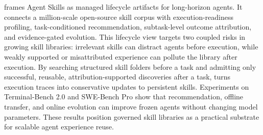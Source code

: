 \ours frames Agent Skills as managed lifecycle artifacts for long-horizon agents. It connects a million-scale open-source skill corpus with execution-readiness profiling, task-conditioned recommendation, subtask-level outcome attribution, and evidence-gated evolution. This lifecycle view targets two coupled risks in growing skill libraries: irrelevant skills can distract agents before execution, while weakly supported or misattributed experience can pollute the library after execution. By searching structured skill folders before a task and admitting only successful, reusable, attribution-supported discoveries after a task, \ours turns execution traces into conservative updates to persistent skills. Experiments on Terminal-Bench 2.0 and SWE-Bench Pro show that recommendation, offline transfer, and online evolution can improve frozen agents without changing model parameters. These results position governed skill libraries as a practical substrate for scalable agent experience reuse.
